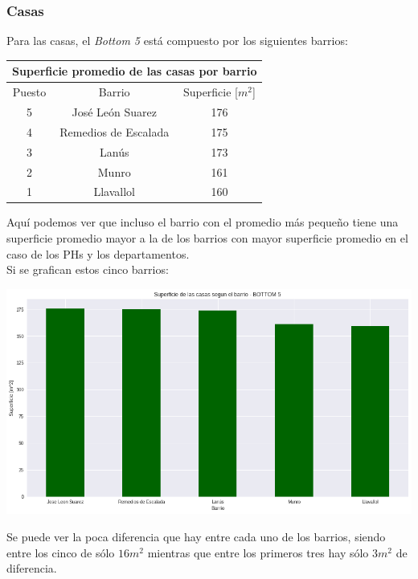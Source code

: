 \documentclass[a4paper, 10pt]{article}
\newcommand\tab[1][0.5cm]{\hspace*{#1}}
\begin{document}
				\subsubsection{Casas}
					Para las casas, el \emph{Bottom 5} está compuesto por los siguientes barrios:
					\begin{center}
						\begin{tabular}{ |c|c|c| }
							\hline
							\multicolumn{3}{|c|}{Superficie promedio de las casas por barrio}\\
							\hline
							\hline
							Puesto & Barrio & Superficie [$m^2$]\\
							\hline
							5 & José León Suarez & 176\\
							4 & Remedios de Escalada & 175\\
							3 & Lanús & 173\\
							2 & Munro & 161 \\
							1 & Llavallol & 160\\
							\hline
						\end{tabular}
					\end{center}
					\tab Aquí podemos ver que incluso el barrio con el promedio más pequeño tiene una superficie promedio mayor
					a la de los barrios con mayor superficie promedio en el caso de los PHs y los departamentos. \\
					\tab Si se grafican estos cinco barrios:
					\begin{center}
   		    				\includegraphics[width=\textwidth]{../images/houseSurfaceBottomBar}
				  	\end{center}
				  	\tab Se puede ver la poca diferencia que hay entre cada uno de los barrios, siendo entre los cinco de sólo
				  	$16m^2$ mientras que entre los primeros tres hay sólo $3m^2$ de diferencia. \\
\end{document}
